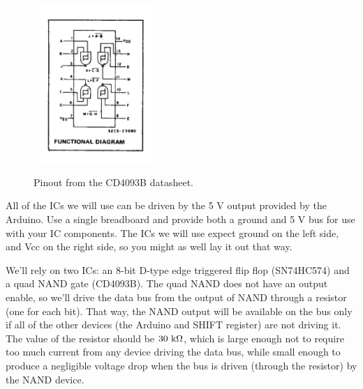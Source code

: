 \documentclass[12pt]{article}
\begin{document}
\begin{figure}[htbp]
\begin{center}
{\includegraphics[width=0.40\textwidth]{figs/CD4093B.png}}
\end{center}
\caption{\label{fig:cd4093b} Pinout from the CD4093B datasheet.}
\end{figure}

All of the ICs we will use can be driven by the 5 V output provided by the Arduino.  Use a single breadboard and provide both a ground and 5 V bus for use with your IC components.  The ICs we will use expect ground on the left side, and Vcc on the right side, so you might as well lay it out that way.

We'll rely on two ICs:  an 8-bit D-type edge triggered flip flop (SN74HC574) and a quad NAND 
gate (CD4093B).  The quad NAND does not have an output enable, so we'll drive the data bus from the output of NAND through a resistor (one for each bit).  That way, the NAND output will be available on the bus only if all of the other devices (the Arduino and SHIFT register) are not driving it.  The value of the resistor should be $30~{\rm k \Omega}$, which is large enough not to require too much current from any device driving the data bus, while small enough to produce a negligible voltage drop when the bus is driven (through the resistor) by the NAND device.
\end{document}
